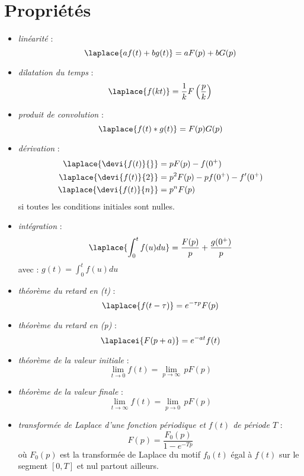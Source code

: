 \section{Propriétés} 
\begin{itemize}
\item \emph{linéarité} :
$$ 
\laplace{af(t)+bg(t)} = aF(p) + bG(p)
$$ 
\item \emph{dilatation du temps} : 
$$
\laplace{f(kt)}=\dfrac{1}{k}F\left(\dfrac{p}{k}\right)
$$
\item \emph{produit de convolution} : 
$$
\laplace{f(t)*g(t)} = F(p)G(p)
$$
\item \emph{dérivation} : 
\begin{align*}
\laplace{\devi{f(t)}{}}&=pF(p) - f(0^+) \\
\laplace{\devi{f(t)}{2}}&=p^2F(p) - pf(0^+) - f'(0^+)\\
\laplace{\devi{f(t)}{n}}&=p^nF(p) 
\end{align*}
si toutes les conditions initiales sont nulles.
\item \emph{intégration} :
$$
\laplace{\int_0^t f(u)du} = \dfrac{F(p)}{p} + \dfrac{g(0^+)}{p}
$$
avec :
$g(t)=\int_0^t f(u)du$
\item \emph{théorème du retard en (t)} :
$$
\laplace{f(t-\tau)}=e^{-\tau p}F(p)
$$
\item \emph{théorème du retard en (p)} :
$$
\laplacei{F(p+a)}=e^{-at}f(t)
$$
\item \emph{théorème de la valeur initiale} :
$$
\lim\limits_{t \to 0} f(t)=\lim\limits_{p \to \infty}\, p F(p)
$$
\item \emph{théorème de la valeur finale} :
$$
\lim\limits_{t \to \infty} f(t)=\lim\limits_{p \to 0}\,p F(p)
$$
\item \emph{transformée de Laplace d'une fonction périodique et $f(t)$ de période $T$} :
$$
        F(p) = \dfrac{F_0(p)}{1-e^{-Tp}}
$$
où $F_0(p)$ est la transformée de Laplace du motif $f_0(t)$ égal à 
$f(t)$ sur le segment $[0,T]$ et nul partout ailleurs.
\end{itemize}
